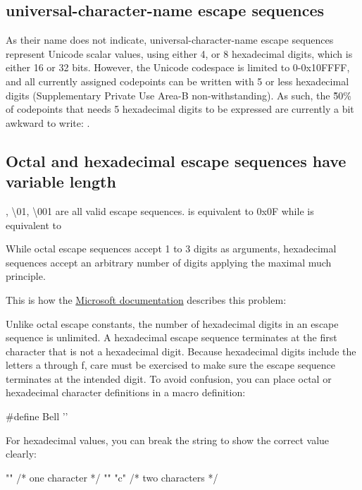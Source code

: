 \documentclass{wg21}
\begin{document}
\subsection{universal-character-name escape sequences}

As their name does not indicate, universal-character-name escape sequences represent Unicode scalar values,
using either 4, or 8 hexadecimal digits, which is either 16 or 32 bits.
However, the Unicode codespace is limited to 0-0x10FFFF, and all currently assigned codepoints can be written with 5 or less
hexadecimal digits (Supplementary Private Use Area-B non-withstanding).
As such, the \~50\% of codepoints that needs 5 hexadecimal digits to be expressed are currently a bit awkward to write: .

\subsection{Octal and hexadecimal escape sequences have variable length}

, {\textbackslash 01}, {\textbackslash 001} are all valid escape sequences.
 is equivalent to 0x0F while  is equivalent to 

While octal escape sequences accept 1 to 3 digits as arguments, hexadecimal sequences accept an arbitrary number of digits
applying the maximal much principle.


This is how the \href{https://docs.microsoft.com/en-us/cpp/c-language/octal-and-hexadecimal-character-specifications?view=msvc-160}{Microsoft documentation} describes this problem:

\begin{quoteblock}
    
    Unlike octal escape constants, the number of hexadecimal digits in an escape sequence is unlimited. A hexadecimal escape sequence terminates at the first character that is not a hexadecimal digit. Because hexadecimal digits include the letters a through f, care must be exercised to make sure the escape sequence terminates at the intended digit. To avoid confusion, you can place octal or hexadecimal character definitions in a macro definition:
    
    \begin{colorblock}
        #define Bell ''
    \end{colorblock}
    
    For hexadecimal values, you can break the string to show the correct value clearly:
    
    \begin{colorblock}
        "\xabc"    /* one character  */
        "\xab" "c" /* two characters */
    \end{colorblock}
    
\end{quoteblock}
\end{document}
